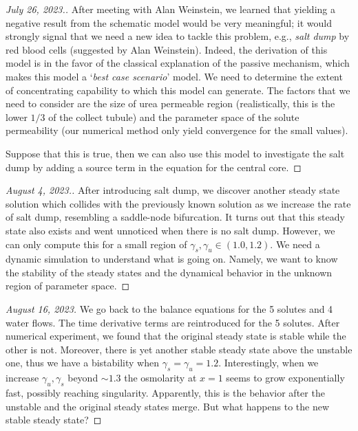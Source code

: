 \documentclass{article}
\numberwithin{equation}{section} %
\begin{document}
\begin{proof}[July 26, 2023.]
    After meeting with Alan Weinstein, we learned that yielding a negative result from the schematic model would be very meaningful; it would strongly signal that we need a new idea to tackle this problem, e.g., \textit{salt dump} by red blood cells (suggested by Alan Weinstein).
    Indeed, the derivation of this model is in the favor of the classical explanation of the passive mechanism, which makes this model a `\textit{best case scenario}' model.
    We need to determine the extent of concentrating capability to which this model can generate.
    The factors that we need to consider are the size of urea permeable region (realistically, this is the lower $1/3$ of the collect tubule) and the parameter space of the solute permeability (our numerical method only yield convergence for the small values).

    Suppose that this is true, then we can also use this model to investigate the salt dump by adding a source term in the equation for the central core.
\end{proof}

\begin{proof}[August 4, 2023.]
    After introducing salt dump, we discover another steady state solution which collides with the previously known solution as we increase the rate of salt dump, resembling a saddle-node bifurcation.
    It turns out that this steady state also exists and went unnoticed when there is no salt dump.
    However, we can only compute this for a small region of $\gamma_s,\gamma_u\in (1.0,1.2)$.
    We need a dynamic simulation to understand what is going on.
    Namely, we want to know the stability of the steady states and the dynamical behavior in the unknown region of parameter space.
\end{proof}

\begin{proof}[August 16, 2023]
    We go back to the balance equations for the 5 solutes and 4 water flows.
    The time derivative terms are reintroduced for the 5 solutes.
    After numerical experiment, we found that the original steady state is stable while the other is not.
    Moreover, there is yet another stable steady state above the unstable one, thus we have a bistability when $\gamma_s=\gamma_u=1.2$.
    Interestingly, when we increase $\gamma_u,\gamma_s$ beyond $\sim 1.3$ the osmolarity at $x=1$ seems to grow exponentially fast, possibly reaching singularity.
    Apparently, this is the behavior after the unstable and the original steady states merge.
    But what happens to the new stable steady state?
\end{proof}
\end{document}
